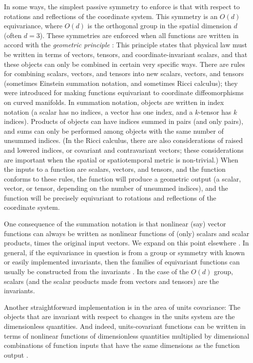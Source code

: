 \documentclass[11pt]{article}
\begin{document}
In some ways, the simplest passive symmetry to enforce is that with respect to rotations and reflections of the coordinate system.
This symmetry is an $O(d)$ equivariance, where $O(d)$ is the orthogonal group in the spatial dimension $d$ (often $d=3$).
These symmetries are enforced when all functions are written in accord with the \emph{geometric principle} \cite{mcp}:
This principle states that physical law must be written in terms of vectors, tensors, and coordinate-invariant scalars, and that these objects can only be combined in certain very specific ways.
There are rules for combining scalars, vectors, and tensors into new scalars, vectors, and tensors (sometimes Einstein \cite{einstein} summation notation, and sometimes Ricci \cite{ricci} calculus); they were introduced for making functions equivariant to coordinate diffeomorphisms on curved manifolds.
In summation notation, objects are written in index notation (a scalar has no indices, a vector has one index, and a $k$-tensor has $k$ indices).
Products of objects can have indices summed in pairs (and only pairs), and sums can only be performed among objects with the same number of unsummed indices.
(In the Ricci calculus, there are also considerations of raised and lowered indices, or covariant and contravariant vectors; these considerations are important when the spatial or spatiotemporal metric is non-trivial.)
When the inputs to a function are scalars, vectors, and tensors, and the function conforms to these rules, the function will produce a geometric output (a scalar, vector, or tensor, depending on the number of unsummed indices), and the function will be precisely equivariant to rotations and reflections of the coordinate system.

One consequence of the summation notation is that nonlinear (say) vector functions can always be written as nonlinear functions of (only) scalars and scalar products, times the original input vectors.
We expand on this point elsewhere \cite{villar2021scalars}.
In general, if the equivariance in question is from a group or symmetry with known or easily implemented invariants, then the families of equivariant functions can usually be constructed from the invariants \cite{blum2022equivariant}.
In the case of the $O(d)$ group, scalars (and the scalar products made from vectors and tensors) are the invariants.

Another straightforward implementation is in the area of units covariance:
The objects that are invariant with respect to changes in the units system are the dimensionless quantities.
And indeed, units-covariant functions can be written in terms of nonlinear functions of dimensionless quantities multiplied by dimensional combinations of function inputs that have the same dimensions as the function output \cite{villar2022dimensionless}.
\end{document}
